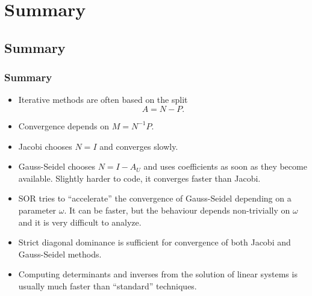 \documentclass{beamer}
\begin{document}
\section{Summary}

\subsection{Summary}

\begin{frame}
  \frametitle{Summary}

  \begin{itemize}
  \item Iterative methods are often based on the split
    \begin{equation*}
      A = N - P.
    \end{equation*}
  \item Convergence depends on $M = N^{-1}P$.
  \item Jacobi chooses $N = I$ and converges slowly.
  \item Gauss-Seidel chooses $N = I - A_U$ and uses coefficients as
    soon as they become available. Slightly harder to code, it
    converges faster than Jacobi.
  \item SOR tries to ``accelerate'' the convergence of Gauss-Seidel
    depending on a parameter $\omega$. It can be faster, but the
    behaviour depends non-trivially on $\omega$ and it is very
    difficult to analyze.
  \item Strict diagonal dominance is sufficient for convergence of
    both Jacobi and Gauss-Seidel methods.
  \item Computing determinants and inverses from the solution of
    linear systems is usually much faster than ``standard''
    techniques.
  \end{itemize}

\end{frame}
\end{document}
